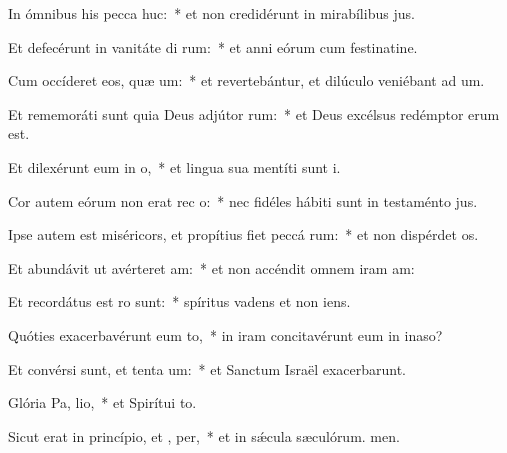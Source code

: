 \item In ómnibus his pecca huc:~* et non credidérunt in mirabílibus jus.
\item Et defecérunt in vanitáte di rum:~* et anni eórum cum festinatine.
\item Cum occíderet eos, quæ um:~* et revertebántur, et dilúculo veniébant ad um.
\item Et rememoráti sunt quia Deus adjútor  rum:~* et Deus excélsus redémptor erum est.
\item Et dilexérunt eum in  o,~* et lingua sua mentíti sunt i.
\item Cor autem eórum non erat rec  o:~* nec fidéles hábiti sunt in testaménto jus.
\item Ipse autem est miséricors, et propítius fiet peccá rum:~* et non dispérdet os.
\item Et abundávit ut avérteret  am:~* et non accéndit omnem iram am:
\item Et recordátus est  ro sunt:~* spíritus vadens et non iens.
\item Quóties exacerbavérunt eum  to,~* in iram concitavérunt eum in inaso?
\item Et convérsi sunt, et tenta um:~* et Sanctum Israël exacerbarunt.
\item Glória Pa,  lio,~* et Spirítui to.
\item Sicut erat in princípio, et ,  per,~* et in sǽcula sæculórum. men.
